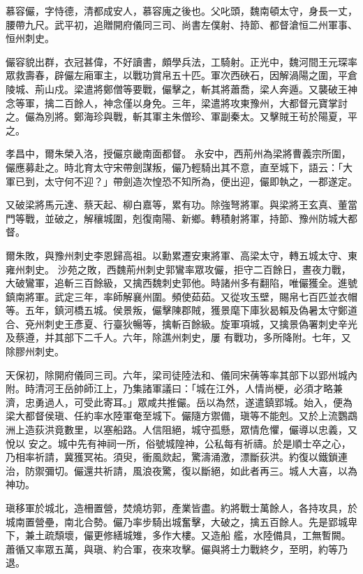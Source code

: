 \begin{pinyinscope}
 慕容儼，字恃德，清都成安人，慕容廆之後也。父叱頭，魏南頓太守，身長一丈，腰帶九尺。武平初，追贈開府儀同三司、尚書左僕射、持節、都督滄恒二州軍事、恒州刺史。



 儼容貌出群，衣冠甚偉，不好讀書，頗學兵法，工騎射。正光中，魏河間王元琛率眾救壽春，辟儼左廂軍主，以戰功賞帛五十匹。軍次西硤石，因解渦陽之圍，平倉陵城、荊山戍。梁遣將鄭僧等要戰，儼擊之，斬其將蕭喬，梁人奔遁。又襲破王神念等軍，擒二百餘人，神念僅以身免。三年，梁遣將攻東豫州，大都督元寶掌討之。儼為別將。鄭海珍與戰，斬其軍主朱僧珍、軍副秦太。又擊賊王茍於陽夏，平之。



 孝昌中，爾朱榮入洛，授儼京畿南面都督。
 永安中，西荊州為梁將曹義宗所圍，儼應募赴之。時北育太守宋帶劍謀叛，儼乃輕騎出其不意，直至城下，語云：「大軍已到，太守何不迎？」帶劍造次惶恐不知所為，便出迎，儼即執之，一郡遂定。



 又破梁將馬元達、蔡天起、柳白嘉等，累有功。除強弩將軍。與梁將王玄真、董當門等戰，並破之，解穰城圍，剋復南陽、新鄉。轉積射將軍，持節、豫州防城大都督。



 爾朱敗，與豫州刺史李恩歸高祖。以勳累遷安東將軍、高梁太守，轉五城太守、東雍州刺史。
 沙苑之敗，西魏荊州刺史郭鸞率眾攻儼，拒守二百餘日，晝夜力戰，大破鸞軍，追斬三百餘級，又擒西魏刺史郭他。時諸州多有翻陷，唯儼獲全。進號鎮南將軍。武定三年，率師解襄州圍。頻使茹茹。又從攻玉壁，賜帛七百匹並衣帽等。五年，鎮河橋五城。侯景叛，儼擊陳郡賊，獲景麾下庫狄曷賴及偽暑太守鄭道合、兗州刺史王彥夏、行臺狄暢等，擒斬百餘級。旋軍項城，又擒景偽署刺史辛光及蔡遵，并其部下二千人。六年，除譙州刺史，屢
 有戰功，多所降附。七年，又除膠州刺史。



 天保初，除開府儀同三司。六年，梁司徒陸法和、儀同宋蒨等率其部下以郢州城內附。時清河王岳帥師江上，乃集諸軍議曰：「城在江外，人情尚梗，必須才略兼濟，忠勇過人，可受此寄耳。」眾咸共推儼。岳以為然，遂遣鎮郢城。始入，便為梁大都督侯瑱、任約率水陸軍奄至城下。儼隨方禦備，瑱等不能剋。又於上流鸚鵡洲上造荻洪竟數里，以塞船路。人信阻絕，城守孤懸，眾情危懼，儼導以忠義，又悅以
 安之。城中先有神祠一所，俗號城隍神，公私每有祈禱。於是順士卒之心，乃相率祈請，冀獲冥祐。須臾，衝風欻起，驚濤涌激，漂斷荻洪。約復以鐵鎖連治，防禦彌切。儼還共祈請，風浪夜驚，復以斷絕，如此者再三。城人大喜，以為神功。



 瑱移軍於城北，造柵置營，焚燒坊郭，產業皆盡。約將戰士萬餘人，各持攻具，於城南置營壘，南北合勢。儼乃率步騎出城奮擊，大破之，擒五百餘人。先是郢城卑下，兼土疏頹壞，儼更修繕城雉，多作大樓。又造船
 艦，水陸備具，工無暫闕。蕭循又率眾五萬，與瑱、約合軍，夜來攻擊。儼與將士力戰終夕，至明，約等乃退。




\end{pinyinscope}
